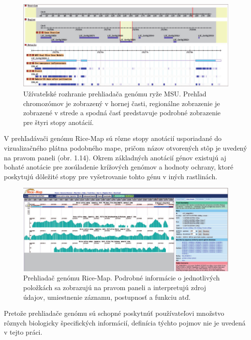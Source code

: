 \begin{figure}[!ht]
	\centering
	\includegraphics[width=.9\textwidth]{figures/ss-1.png}
	\caption{Užívateľské rozhranie prehliadača genómu ryže MSU. Prehľad chromozómov je zobrazený v hornej časti, regionálne zobrazenie je zobrazené v strede a spodná časť predstavuje podrobné zobrazenie pre štyri stopy anotácií.\label{o:latex_friendly_zone}}
\end{figure}

V prehľadávači genómu Rice-Map sú rôzne stopy anotácií usporiadané do vizualizačného plátna podobného mape, pričom názov otvorených stôp je uvedený na pravom paneli (obr. 1.14).
Okrem základných anotácií génov existujú aj bohaté anotácie pre zosúladenie krížových genómov a hodnoty ochrany, ktoré poskytujú dôležité stopy pre vyšetrovanie tohto génu v iných rastlinách.

\begin{figure}[!ht]
	\centering
	\includegraphics[width=.9\textwidth]{figures/ss-2.png}
	\caption{Prehliadač genómu Rice-Map. Podrobné informácie o jednotlivých položkách sa zobrazujú na pravom paneli a interpretujú zdroj údajov, umiestnenie záznamu, postupnosť a funkciu atď.\label{o:latex_friendly_zone}}
\end{figure}

Pretože prehliadače genómu sú schopné poskytnúť používateľovi množstvo rôznych biologicky špecifických informácií, definícia týchto pojmov nie je uvedená v tejto práci.